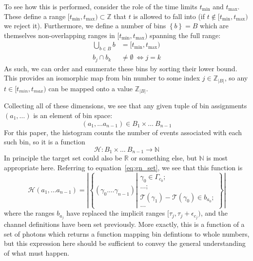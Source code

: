 \documentclass{article}
\newcommand{\braces}[1]{\ensuremath{\left\lbrace #1 \right\rbrace}}
\newcommand{\integers}{\ensuremath{\mathbb{Z}}}
\newcommand{\wholes}{\ensuremath{\mathbb{N}}}
\newcommand{\reals}{\ensuremath{\mathbb{R}}}
\newcommand{\abs}[1]{\ensuremath{\left|#1\right|}}
\newcommand{\Time}{\ensuremath{\mathcal{T}}}
\newcommand{\photon}{\ensuremath{\gamma}}
\newcommand{\photons}{\ensuremath{\Gamma}}
\newcommand{\resolution}{\ensuremath{\epsilon}}
\newcommand{\Histogram}{\ensuremath{\mathcal{H}}}
\begin{document}
To see how this is performed, consider the role of the time limits $t_{\min}$ and $t_{\max}$. These define a range $[t_{\min},t_{\max})\subset\integers$ that $t$ is allowed to fall into (if $t\not\in[t_{\min},t_{\max})$ we reject it). Furthermore, we define a number of bins $\braces{b}=B$ which are themselves non-overlapping ranges in $[t_{\min},t_{\max})$ spanning the full range:
\begin{align}
\bigcup\limits_{b\in B}{b} &= [t_{\min},t_{\max}) \\
b_{j}\cap b_{k}&\not=\emptyset~\iff j=k
\end{align} 
As such, we can order and enumerate these bins by sorting their lower bound. This provides an isomorphic map from bin number to some index $j\in\integers_{\abs{B}}$, so any $t\in[t_{min},t_{max})$ can be mapped onto a value $\integers_{\abs{B}}$. 

Collecting all of these dimensions, we see that any given tuple of bin assignments $(a_{1},\ldots)$ is an element of bin space:
\begin{equation}
(a_{1},\ldots a_{n-1})\in B_{1}\times\ldots~B_{n-1}
\end{equation}
For this paper, the histogram counts the number of events associated with each such bin, so it is a function
\begin{equation}
\Histogram:B_{1}\times\ldots~B_{n-1}\rightarrow\wholes
\end{equation}
In principle the target set could also be \reals{} or something else, but \wholes{} is most appropriate here. Referring to equation~\ref{eq:gn_set}, we see that this function is
\begin{equation}
\Histogram(a_{1},\ldots a_{n-1}) = \abs{\braces{(\photon_{0}.\ldots\photon_{n-1})
                                              \left|\begin{aligned}
                                              \gamma_{0}\in\photons_{c_{0}};\\ 
                                              \ldots;\\                                              
                                              \Time(\photon_{1})-\Time(\photon_{0})\in b_{a_{0}};\\
                                              \ldots
                                              \end{aligned}\right.}}
\end{equation}
where the ranges $b_{a_{j}}$ have replaced the implicit ranges $[\tau_{j},\tau_{j}+\resolution_{c_{j}})$, and the channel definitions have been set previously. More exactly, this is a function of a set of photons which returns a function mapping bin defintions to whole numbers, but this expression here should be sufficient to convey the general understanding of what must happen.
\end{document}

